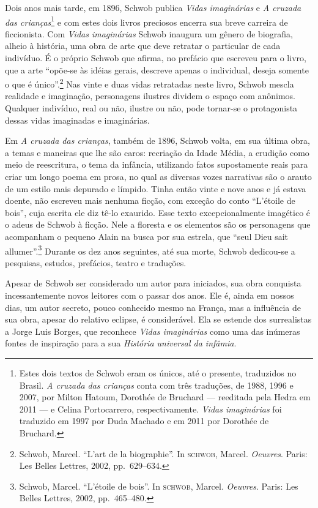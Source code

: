 Dois anos mais tarde, em 1896, Schwob publica \textit{Vidas imaginárias} e
\textit{A cruzada das crianças}\footnote{ Estes dois textos de Schwob eram os
únicos, até o presente, traduzidos no Brasil. \textit{A cruzada das crianças}
conta com três traduções, de 1988, 1996 e 2007, por Milton Hatoum, Dorothée de
Bruchard --- reeditada pela Hedra em 2011 --- e Celina Portocarrero, respectivamente. \textit{Vidas imaginárias} foi
traduzido em 1997 por Duda Machado e em 2011 por Dorothée de Bruchard.} e com estes dois livros preciosos
encerra sua breve carreira de ficcionista. Com \textit{Vidas imaginárias} Schwob
inaugura um gênero de biografia, alheio à história, uma obra de
arte que deve retratar o particular de cada indivíduo. É o próprio Schwob que
afirma, no prefácio que escreveu para o livro, que a arte “opõe-se às idéias
gerais, descreve apenas o individual, deseja somente o que é único”.\footnote{ Schwob, Marcel. 
``L’art de la biographie''. In \textsc{schwob}, Marcel. \textit{Oeuvres}.
Paris: Les Belles Lettres, 2002, pp.~629--634.} Nas vinte e duas vidas
retratadas neste livro, Schwob mescla realidade e imaginação, personagens
ilustres dividem o espaço com anônimos. Qualquer indivíduo, real ou não,
ilustre ou não, pode tornar-se o protagonista dessas vidas imaginadas e imaginárias.

Em \textit{A cruzada das crianças}, também de 1896,
Schwob volta, em sua última obra, a temas e maneiras que lhe são caros:
recriação da Idade Média, a erudição como meio de reescritura, o tema da
infância, utilizando fatos supostamente reais para criar um longo poema em
prosa, no qual as diversas vozes narrativas são o arauto de um estilo mais
depurado e límpido. Tinha então vinte e nove anos e já estava doente, não
escreveu mais nenhuma ficção, com exceção do conto “L'étoile de bois”, cuja
escrita ele diz tê-lo exaurido. Esse texto excepcionalmente imagético é o adeus de Schwob
à ficção. Nele a floresta e
os elementos são os personagens que acompanham o pequeno Alain na busca por sua
estrela, que “seul Dieu sait allumer”.\footnote{ Schwob, Marcel. ``L’étoile de
bois''. In \textsc{schwob}, Marcel. \textit{Oeuvres}. Paris: Les Belles Lettres, 2002, pp.~465--480.}
Durante os dez anos seguintes, até sua morte, Schwob dedicou-se a
pesquisas, estudos, prefácios, teatro e traduções.

Apesar de Schwob ser considerado um autor para iniciados, sua obra conquista
incessantemente novos leitores com o passar dos anos. Ele é, ainda em nossos
dias, um autor secreto, pouco conhecido mesmo na França, mas a influência de
sua obra, apesar do relativo eclipse, é considerável. Ela se estende
dos surrealistas a Jorge Luis Borges, que reconhece \textit{Vidas imaginárias}
como uma das inúmeras fontes de inspiração para a sua \textit{História
universal da infâmia}.

